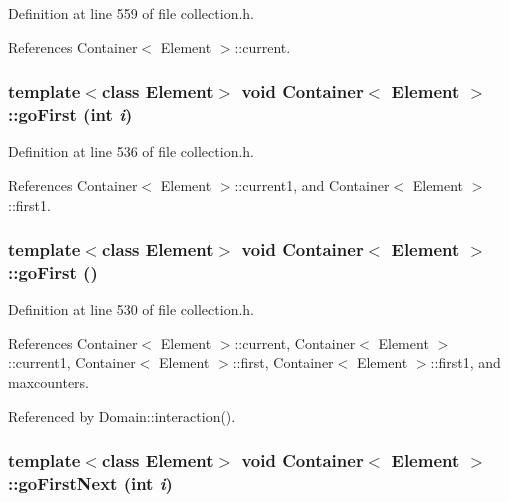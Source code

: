 Definition at line 559 of file collection.h.

References Container$<$ Element $>$::current.\hypertarget{classContainer_015098542faf481295e1fb47ff56873b}{
\subsubsection[{goFirst}]{\setlength{\rightskip}{0pt plus 5cm}template$<$class Element$>$ void {\bf Container}$<$ Element $>$::goFirst (int {\em i})}}
\label{classContainer_015098542faf481295e1fb47ff56873b}




Definition at line 536 of file collection.h.

References Container$<$ Element $>$::current1, and Container$<$ Element $>$::first1.\hypertarget{classContainer_13215ed83f7c0d7efd24ae3af33a1ff3}{
\subsubsection[{goFirst}]{\setlength{\rightskip}{0pt plus 5cm}template$<$class Element$>$ void {\bf Container}$<$ Element $>$::goFirst ()}}
\label{classContainer_13215ed83f7c0d7efd24ae3af33a1ff3}




Definition at line 530 of file collection.h.

References Container$<$ Element $>$::current, Container$<$ Element $>$::current1, Container$<$ Element $>$::first, Container$<$ Element $>$::first1, and maxcounters.

Referenced by Domain::interaction().\hypertarget{classContainer_019351e1c671dd3459739f86fbc4f827}{
\subsubsection[{goFirstNext}]{\setlength{\rightskip}{0pt plus 5cm}template$<$class Element$>$ void {\bf Container}$<$ Element $>$::goFirstNext (int {\em i})}}
\label{classContainer_019351e1c671dd3459739f86fbc4f827}




